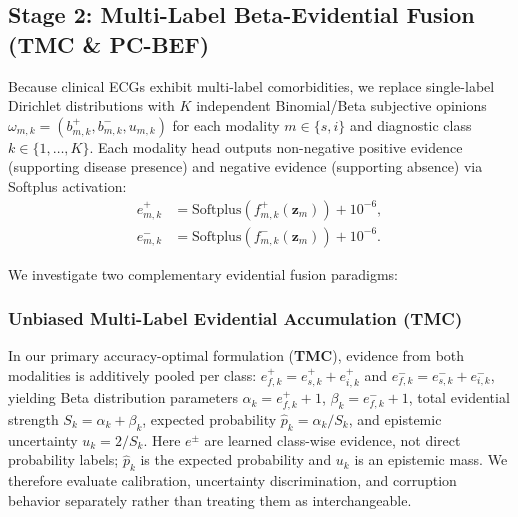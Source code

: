 \documentclass[preprint,12pt]{elsarticle}
\begin{document}
\subsection{Stage 2: Multi-Label Beta-Evidential Fusion (TMC \& PC-BEF)}
Because clinical ECGs exhibit multi-label comorbidities, we replace single-label Dirichlet distributions with $K$ independent Binomial/Beta subjective opinions $\omega_{m,k} = (b_{m,k}^+, b_{m,k}^-, u_{m,k})$ for each modality $m \in \{s, i\}$ and diagnostic class $k \in \{1, \dots, K\}$. Each modality head outputs non-negative positive evidence (supporting disease presence) and negative evidence (supporting absence) via Softplus activation:
\begin{equation}
\begin{aligned}
    e_{m,k}^+ &= \text{Softplus}(f_{m,k}^+(\bm{z}_m)) + 10^{-6},\\
    e_{m,k}^- &= \text{Softplus}(f_{m,k}^-(\bm{z}_m)) + 10^{-6}.
\end{aligned}
\end{equation}

We investigate two complementary evidential fusion paradigms:
\subsubsection{Unbiased Multi-Label Evidential Accumulation (TMC)}
In our primary accuracy-optimal formulation (\textbf{TMC}), evidence from both modalities is additively pooled per class: $e_{f,k}^+ = e_{s,k}^+ + e_{i,k}^+$ and $e_{f,k}^- = e_{s,k}^- + e_{i,k}^-$, yielding Beta distribution parameters $\alpha_k = e_{f,k}^+ + 1$, $\beta_k = e_{f,k}^- + 1$, total evidential strength $S_k = \alpha_k + \beta_k$, expected probability $\hat{p}_k = \alpha_k / S_k$, and epistemic uncertainty $u_k = 2 / S_k$. Here $e^\pm$ are learned class-wise evidence, not direct probability labels; $\hat p_k$ is the expected probability and $u_k$ is an epistemic mass. We therefore evaluate calibration, uncertainty discrimination, and corruption behavior separately rather than treating them as interchangeable.
\end{document}
